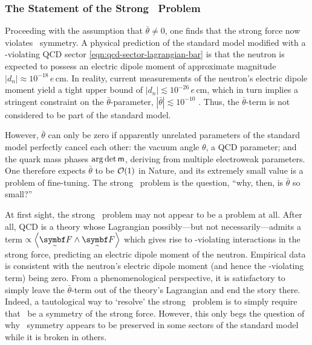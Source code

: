 \subsubsection{The Statement of the Strong \CP\ Problem}


Proceeding with the assumption that $\bar θ \ne 0$, one finds that the strong force now violates \CP\ symmetry.
A physical prediction of the standard model modified with a \CP-violating QCD sector \eqref{eqn:qcd-sector-lagrangian-bar} is that the neutron is expected to possess an electric dipole moment of approximate magnitude $|d_n| \approx 10^{-18} \,e\,\mathrm{cm}$.
In reality, current measurements \cite{electric_dipole_neutron_2020} of the neutron's electric dipole moment yield a tight upper bound of $|d_n| \lesssim 10^{-26} \,e\,\mathrm{cm}$, which in turn implies a stringent constraint on the $\bar θ$-parameter, $|\bar θ| \lesssim 10^{-10}$ \cite{ParticleDataGroup-review-2020}.
Thus, the $\bar θ$-term is not considered to be part of the standard model.

However, $\bar θ$ can only be zero if apparently unrelated parameters of the standard model perfectly cancel each other: the vacuum angle $θ$, a QCD parameter; and the quark mass phases $\arg\det\mat m$, deriving from multiple electroweak parameters.
One therefore expects $\bar θ$ to be $\cal O(1)$ in Nature, and its extremely small value is a problem of fine-tuning.
The strong \CP\ problem is the question, ``why, then, is $\bar θ$ so small?''




At first sight, the strong \CP\ problem may not appear to be a problem at all.
After all, QCD is a theory whose Lagrangian possibly---but not necessarily---admits a term $\propto \angbr{\tsbm F \wedge \tsbm F}$ which gives rise to \CP-violating interactions in the strong force, predicting an electric dipole moment of the neutron.
Empirical data is consistent with the neutron's electric dipole moment (and hence the \CP-violating term) being zero.
From a phenomenological perspective, it is satisfactory to simply leave the $\bar θ$-term out of the theory's Lagrangian and end the story there.
Indeed, a tautological way to `resolve' the strong \CP\ problem is to simply require that \CP\ be a symmetry of the strong force.
However, this only begs the question of why \CP\ symmetry appears to be preserved in some sectors of the standard model while it is broken in others.

